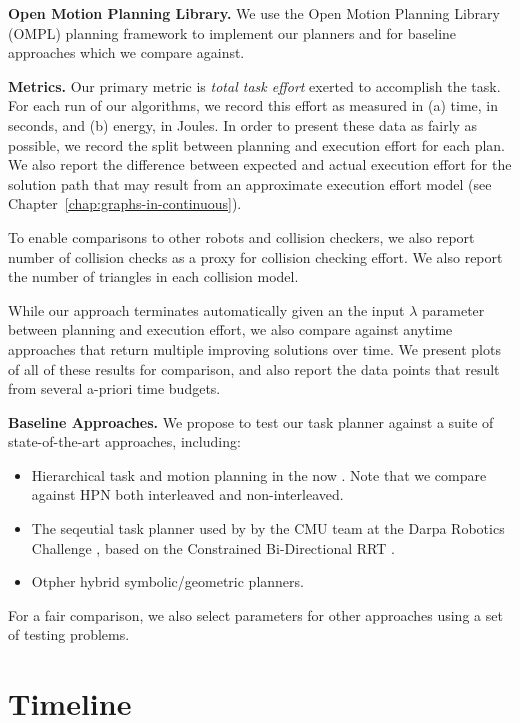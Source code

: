 {\textbf{Open Motion Planning Library.}
We use the Open Motion Planning Library (OMPL)
planning framework \citep{sucan2012ompl}
to implement our planners
and for baseline approaches which we compare against.

\textbf{Metrics.}
Our primary metric is \emph{total task effort} exerted to accomplish
the task.
For each run of our algorithms,
we record this effort as measured in
(a) time, in seconds,
and (b) energy, in Joules.
In order to present these data as fairly as possible,
we record the split between planning and execution effort
for each plan.
We also report the difference between expected and actual
execution effort for the solution path
that may result from an approximate execution effort model
(see Chapter~\ref{chap:graphs-in-continuous}).

To enable comparisons to other robots and collision checkers,
we also report number of collision checks as a proxy for collision
checking effort.
We also report the number of triangles in each collision model.

While our approach terminates automatically
given an the input $\lambda$ parameter between planning and execution
effort,
we also compare against anytime approaches that return multiple
improving solutions over time.
We present plots of all of these results for comparison,
and also report the data points that result from several
a-priori time budgets.

\textbf{Baseline Approaches.}
We propose to test our task planner against a suite of
state-of-the-art approaches,
including:
\begin{itemize}
\item Hierarchical task and motion planning in the now
   \citep{kaelbling2011inthenow}.
   Note that we compare against HPN both
   interleaved and non-interleaved.
\item The seqeutial task planner used by by the CMU team
   at the Darpa Robotics Challenge
   \citep{dellin2014drc},
   based on the Constrained Bi-Directional RRT
   \cite{berenson2009manifolds}.
\item Otpher hybrid symbolic/geometric planners.
\end{itemize}
For a fair comparison,
we also select parameters for other approaches using a set of testing
problems.

}%

\section{Timeline}

